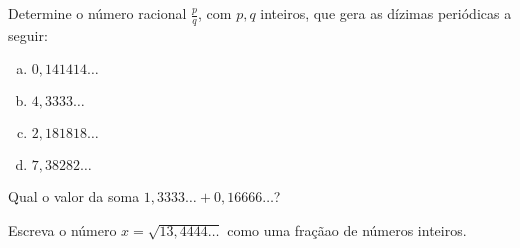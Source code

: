 \begin{secExercicios}
\begin{exer}
    Determine o número racional $\frac{p}{q}$, com $p,q$ inteiros, que gera as dízimas periódicas a seguir:
    \begin{multicols}{2}
    \begin{enumerate}[a)]
        \item $0,141414\dots$
        \item $4,3333\dots$
        \item $2,181818\dots$
        \item $7,38282\dots$
    \end{enumerate}
    \end{multicols}
\end{exer}

\begin{exer}
    Qual o valor da soma $1,3333\dots + 0,16666\dots$?
\end{exer}

\begin{exer}
    Escreva o número $x =\sqrt{13,4444\dots}$ como uma fraçãao de números inteiros.
\end{exer}



\end{secExercicios}